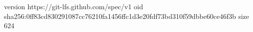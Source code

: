 version https://git-lfs.github.com/spec/v1
oid sha256:0ff83cd830291087cc76210fa1456ffc1d3e20fdf73bd310f59dbbe60ce46f3b
size 624
